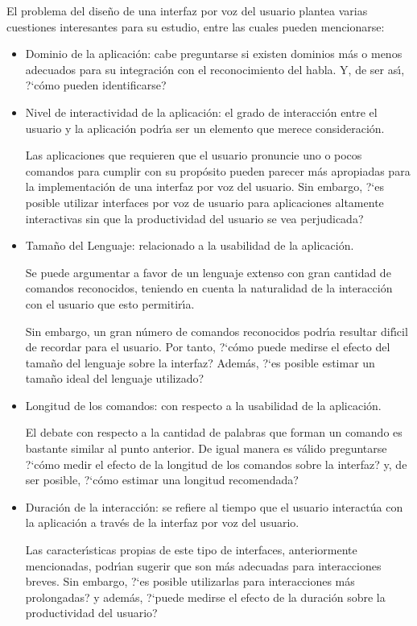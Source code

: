 El problema del dise\~no de una interfaz por voz del usuario plantea varias cuestiones interesantes para
su estudio, entre las cuales pueden mencionarse:

\begin{itemize}
	\item Dominio de la aplicaci\'on: cabe preguntarse si existen dominios m\'as o menos adecuados para su
	integraci\'on con el reconocimiento del habla. Y, de ser as{\'\i}, {?`}c\'omo pueden identificarse?
	\item Nivel de interactividad de la aplicaci\'on: el grado de interacci\'on entre el usuario y
	la aplicaci\'on podr{\'\i}a ser un elemento que merece consideraci\'on.
	
	Las aplicaciones que requieren que el usuario pronuncie uno o pocos comandos para cumplir con su
	prop\'osito pueden parecer m\'as apropiadas para la implementaci\'on de una interfaz por voz del usuario.
	Sin embargo, {?`}es posible utilizar interfaces por voz de usuario para aplicaciones altamente
	interactivas sin que la productividad del usuario se vea perjudicada?

	\item Tama\~no del Lenguaje: relacionado a la usabilidad de la aplicaci\'on.

	Se puede argumentar a favor de un lenguaje extenso con gran cantidad de comandos reconocidos, 
	teniendo en cuenta la naturalidad de la interacci\'on con el usuario que esto permitir{\'\i}a.

	Sin embargo, un gran n\'umero de comandos reconocidos podr{\'\i}a resultar dif{\'\i}cil de recordar para
	el usuario. Por tanto, {?`}c\'omo puede medirse el efecto del tama\~no del lenguaje sobre la interfaz? 
	Adem\'as, {?`}es posible estimar un tama\~no ideal del lenguaje utilizado?

	\item Longitud de los comandos: con respecto a la usabilidad de la aplicaci\'on.

	El debate con respecto a la cantidad de palabras que forman un comando es bastante similar
	al punto anterior. De igual manera es v\'alido preguntarse {?`}c\'omo medir el efecto de la longitud
	de los comandos sobre la interfaz? y, de ser posible, {?`}c\'omo estimar una longitud recomendada?

	\item Duraci\'on de la interacci\'on: se refiere al tiempo que el usuario interact\'ua con la aplicaci\'on
	a trav\'es de la interfaz por voz del usuario.

	Las caracter{\'\i}sticas propias de este tipo de interfaces, anteriormente mencionadas, podr{\'\i}an sugerir
	que son m\'as adecuadas para interacciones breves. Sin embargo, {?`}es posible utilizarlas para 
	interacciones m\'as prolongadas? y adem\'as, {?`}puede medirse el efecto de la duraci\'on sobre la productividad
	del usuario? 

\end{itemize}


